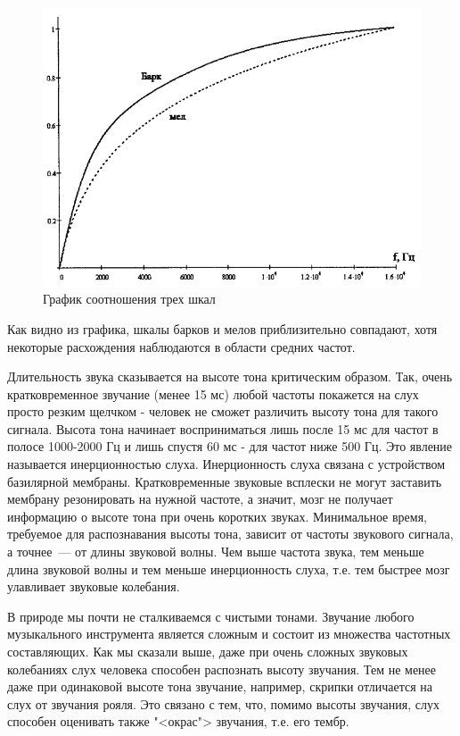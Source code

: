 \documentclass[oneside, final, 14pt]{extreport}
\begin{document}
\begin{figure}[ht]
\centering
\includegraphics[scale=0.8]{pic-ear-05}
\caption{График соотношения трех шкал}
\label{pic-ear-05}
\end{figure}

Как видно из графика, шкалы барков и мелов приблизительно совпадают, хотя некоторые расхождения наблюдаются в области средних частот.

Длительность звука сказывается на высоте тона критическим образом. Так, очень кратковременное звучание (менее 15 мс) любой частоты покажется на слух просто резким щелчком - человек не сможет различить высоту тона для такого сигнала. Высота тона начинает восприниматься лишь после 15 мс для частот в полосе 1000-2000 Гц и лишь спустя 60 мс - для частот ниже 500 Гц. Это явление называется инерционностью слуха. Инерционность слуха связана с устройством базилярной мембраны. Кратковременные звуковые всплески не могут заставить
мембрану резонировать на нужной частоте, а значит, мозг не получает информацию о высоте тона при очень коротких звуках. Минимальное время, требуемое для распознавания высоты тона, зависит от частоты звукового сигнала, а точнее~--- от длины звуковой волны. Чем выше частота звука, тем меньше длина звуковой волны и тем меньше инерционность слуха, т.е. тем быстрее мозг улавливает звуковые колебания.

В природе мы почти не сталкиваемся с чистыми тонами. Звучание любого музыкального инструмента является сложным и состоит из множества частотных составляющих. Как мы сказали выше, даже при очень сложных звуковых колебаниях слух человека способен распознать высоту звучания. Тем не менее даже при одинаковой высоте тона звучание, например, скрипки отличается на слух от звучания рояля. Это связано с тем, что, помимо высоты звучания, слух способен оценивать также "<окрас"> звучания, т.е. его тембр. 
\end{document}
